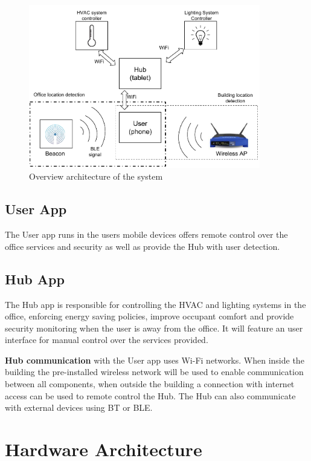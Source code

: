 \begin{figure}[h]
\centering
\includegraphics[width=0.9\textwidth]{Figures/harware_arch}
\caption{Overview architecture of the system}
\label{software1}
\end{figure}


\subsection{User App}

The User app runs in the users mobile devices offers remote control over the office services and security as well as provide the Hub with user detection.



\subsection{Hub App}

The Hub app is responsible for controlling the HVAC and lighting systems in the office, enforcing energy saving policies, improve occupant comfort and provide security monitoring when the user is away from the office.
It will feature an user interface for manual control over the services provided.


\textbf{Hub communication} with the User app uses Wi-Fi networks. When inside the building the pre-installed wireless network will be used to enable communication between all components, when outside the building a connection with internet access can be used to remote control the Hub. The Hub can also communicate with external devices using \ac{BT} or \ac{BLE}.


\section{Hardware Architecture}\label{architecture3} 

